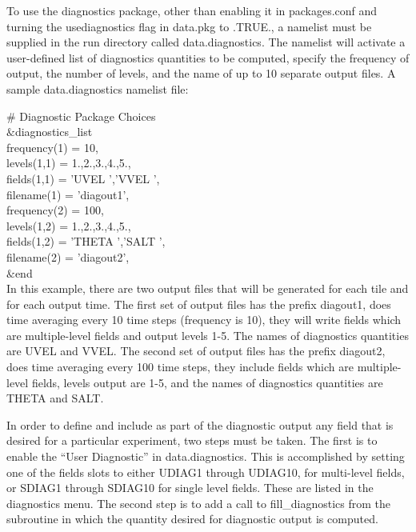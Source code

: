 \noindent
To use the diagnostics package, other than enabling it in packages.conf
and turning the usediagnostics flag in data.pkg to .TRUE., a namelist
must be supplied in the run directory called data.diagnostics. The namelist
will activate a user-defined list of diagnostics quantities to be computed,
specify the frequency of output, the number of levels, and the name of
up to 10 separate output files. A sample data.diagnostics namelist file:

\noindent
$\#$ Diagnostic Package Choices \\
 $\&$diagnostics\_list \\
  frequency(1) = 10, \ \\
   levels(1,1) = 1.,2.,3.,4.,5., \ \\
   fields(1,1) = 'UVEL    ','VVEL    ', \ \\
   filename(1) = 'diagout1', \ \\
  frequency(2) = 100, \ \\
   levels(1,2) = 1.,2.,3.,4.,5., \ \\
   fields(1,2) = 'THETA   ','SALT    ', \ \\
   filename(2) = 'diagout2', \ \\
 $\&$end \ \\

\noindent
In this example, there are two output files that will be generated
for each tile and for each output time. The first set of output files
has the prefix diagout1, does time averaging every 10 time steps
(frequency is 10), they will write fields which are multiple-level 
fields and output levels 1-5. The names of diagnostics quantities are 
UVEL and VVEL.  The second set of output files
has the prefix diagout2, does time averaging every 100 time steps,
they include fields which are multiple-level fields, levels output are 1-5,
and the names of diagnostics quantities are THETA and SALT.

\noindent
In order to define and include as part of the diagnostic output any field
that is desired for a particular experiment, two steps must be taken. The
first is to enable the ``User Diagnostic'' in data.diagnostics. This is
accomplished by setting one of the fields slots to either UDIAG1 through 
UDIAG10, for multi-level fields, or SDIAG1 through SDIAG10 for single level
fields. These are listed in the diagnostics menu. The second step is to
add a call to fill\_diagnostics from the subroutine in which the quantity
desired for diagnostic output is computed. 

\newpage

